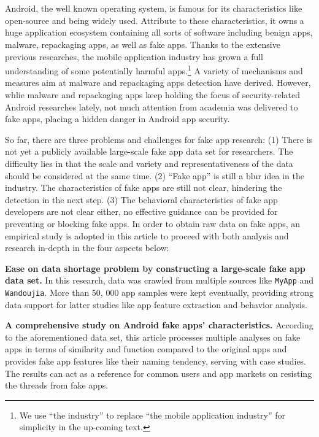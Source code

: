 \newpage
\cleardoublepage{}

\chapter*{}
\vspace{-5mm}


Android, the well known operating system, is famous for its characteristics like open-source and being widely used.
Attribute to these characteristics, it owns a huge application ecosystem containing all sorts of software including benign apps, malware, repackaging apps, as well as fake apps.
Thanks to the extensive previous researches, the mobile application industry has grown a full understanding of some potentially harmful apps.\footnote{We use ``the industry'' to replace ``the mobile application industry'' for simplicity in the up-coming text.}
A variety of mechanisms and measures aim at malware and repackaging apps detection have derived.
However, whlie malware and repackaging apps keep holding the focus of security-related Android researches lately, not much attention from academia was delivered to fake apps, placing a hidden danger in Android app security.

So far, there are three problems and challenges for fake app research:
(1) There is not yet a publicly available large-scale fake app data set for researchers. The difficulty lies in that the scale and variety and representativeness of the data should be considered at the same time.
(2) ``Fake app'' is still a blur idea in the industry. The characteristics of fake apps are still not clear,  hindering the detection in the next step.
(3) The behavioral characteristics of fake app developers are not clear either, no effective guidance can be provided for preventing or blocking fake apps.
In order to obtain raw data on fake apps, an empirical study is adopted in this article to proceed with both analysis and research in-depth in the four aspects below:


\textbf{Ease on data shortage problem by constructing a large-scale fake app data set. }
In this research, data was crawled from multiple sources like \texttt{MyApp} and \texttt{Wandoujia}.
More than 50, 000 app samples were kept eventually, providing strong data support for latter studies like app feature extraction and behavior analysis.

\textbf{A comprehensive study on Android fake apps' characteristics. }
According to the aforementioned data set, this article processes multiple analyses on fake apps in terms of similarity and function compared to the original apps and provides fake app features like their naming tendency, serving with case studies.
The results can act as a reference for common users and app markets on resisting the threads from fake apps.

